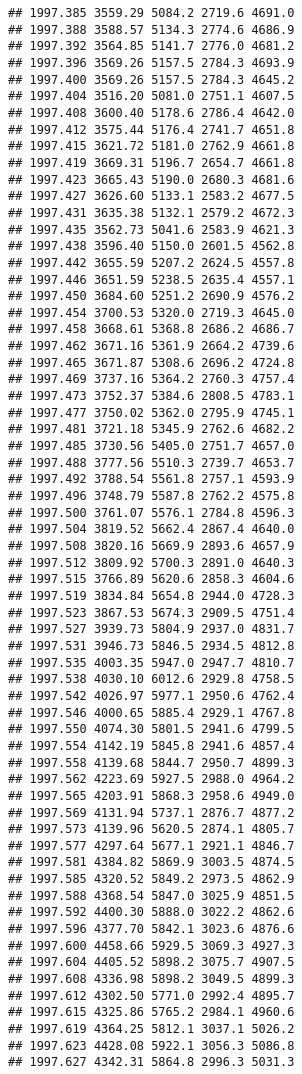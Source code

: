 \documentclass[
]{article}
\begin{document}
\begin{verbatim}
## 1997.385 3559.29 5084.2 2719.6 4691.0
## 1997.388 3588.57 5134.3 2774.6 4686.9
## 1997.392 3564.85 5141.7 2776.0 4681.2
## 1997.396 3569.26 5157.5 2784.3 4693.9
## 1997.400 3569.26 5157.5 2784.3 4645.2
## 1997.404 3516.20 5081.0 2751.1 4607.5
## 1997.408 3600.40 5178.6 2786.4 4642.0
## 1997.412 3575.44 5176.4 2741.7 4651.8
## 1997.415 3621.72 5181.0 2762.9 4661.8
## 1997.419 3669.31 5196.7 2654.7 4661.8
## 1997.423 3665.43 5190.0 2680.3 4681.6
## 1997.427 3626.60 5133.1 2583.2 4677.5
## 1997.431 3635.38 5132.1 2579.2 4672.3
## 1997.435 3562.73 5041.6 2583.9 4621.3
## 1997.438 3596.40 5150.0 2601.5 4562.8
## 1997.442 3655.59 5207.2 2624.5 4557.8
## 1997.446 3651.59 5238.5 2635.4 4557.1
## 1997.450 3684.60 5251.2 2690.9 4576.2
## 1997.454 3700.53 5320.0 2719.3 4645.0
## 1997.458 3668.61 5368.8 2686.2 4686.7
## 1997.462 3671.16 5361.9 2664.2 4739.6
## 1997.465 3671.87 5308.6 2696.2 4724.8
## 1997.469 3737.16 5364.2 2760.3 4757.4
## 1997.473 3752.37 5384.6 2808.5 4783.1
## 1997.477 3750.02 5362.0 2795.9 4745.1
## 1997.481 3721.18 5345.9 2762.6 4682.2
## 1997.485 3730.56 5405.0 2751.7 4657.0
## 1997.488 3777.56 5510.3 2739.7 4653.7
## 1997.492 3788.54 5561.8 2757.1 4593.9
## 1997.496 3748.79 5587.8 2762.2 4575.8
## 1997.500 3761.07 5576.1 2784.8 4596.3
## 1997.504 3819.52 5662.4 2867.4 4640.0
## 1997.508 3820.16 5669.9 2893.6 4657.9
## 1997.512 3809.92 5700.3 2891.0 4640.3
## 1997.515 3766.89 5620.6 2858.3 4604.6
## 1997.519 3834.84 5654.8 2944.0 4728.3
## 1997.523 3867.53 5674.3 2909.5 4751.4
## 1997.527 3939.73 5804.9 2937.0 4831.7
## 1997.531 3946.73 5846.5 2934.5 4812.8
## 1997.535 4003.35 5947.0 2947.7 4810.7
## 1997.538 4030.10 6012.6 2929.8 4758.5
## 1997.542 4026.97 5977.1 2950.6 4762.4
## 1997.546 4000.65 5885.4 2929.1 4767.8
## 1997.550 4074.30 5801.5 2941.6 4799.5
## 1997.554 4142.19 5845.8 2941.6 4857.4
## 1997.558 4139.68 5844.7 2950.7 4899.3
## 1997.562 4223.69 5927.5 2988.0 4964.2
## 1997.565 4203.91 5868.3 2958.6 4949.0
## 1997.569 4131.94 5737.1 2876.7 4877.2
## 1997.573 4139.96 5620.5 2874.1 4805.7
## 1997.577 4297.64 5677.1 2921.1 4846.7
## 1997.581 4384.82 5869.9 3003.5 4874.5
## 1997.585 4320.52 5849.2 2973.5 4862.9
## 1997.588 4368.54 5847.0 3025.9 4851.5
## 1997.592 4400.30 5888.0 3022.2 4862.6
## 1997.596 4377.70 5842.1 3023.6 4876.6
## 1997.600 4458.66 5929.5 3069.3 4927.3
## 1997.604 4405.52 5898.2 3075.7 4907.5
## 1997.608 4336.98 5898.2 3049.5 4899.3
## 1997.612 4302.50 5771.0 2992.4 4895.7
## 1997.615 4325.86 5765.2 2984.1 4960.6
## 1997.619 4364.25 5812.1 3037.1 5026.2
## 1997.623 4428.08 5922.1 3056.3 5086.8
## 1997.627 4342.31 5864.8 2996.3 5031.3

\end{verbatim}
\end{document}
